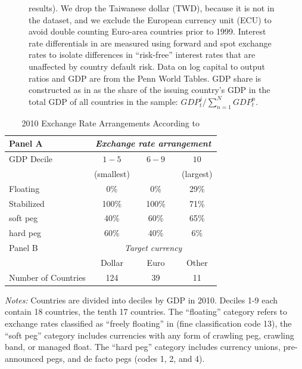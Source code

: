 \documentclass[12pt,letter]{article}
\theoremstyle{break} \theorembodyfont{\normalfont\itshape}
\theoremstyle{break}
\theoremstyle{break} \theorembodyfont{\normalfont\itshape}
\theoremstyle{break} \theorembodyfont{\normalfont\itshape}
\begin{document}
\begin{figure}
\begin{minipage}{\linewidth}
    results). We drop the Taiwanese dollar (TWD), because it is not in
    the \citet{ilzetzki2018exchange} dataset, and we exclude the
    European currency unit (ECU) to avoid double counting Euro-area
    countries prior to 1999. Interest rate differentials in
    \citet{HassanMano2015} are measured using forward and spot
    exchange rates to isolate differences in ``risk-free'' interest
    rates that are unaffected by country default risk. Data on log
    capital to output ratios and GDP are from the Penn World Tables.
    GDP share is constructed as in \cite{Hassan2013} as the share of
    the issuing country's GDP in the total GDP of all countries in the
    sample: $GDP^j_t / \sum^N_{n = 1} GDP^n_t$.
  \end{minipage}
\end{figure}

\clearpage

\begin{table}[]
  \caption{2010 Exchange Rate Arrangements According to
    \citet*{ilzetzki2018exchange}\label{ta:RR}}
  \begin{center}
    \begin{tabular}{lccc}
      \hline \hline
      Panel A & \multicolumn{3}{c}{\textit{Exchange rate arrangement}} \\
      \midrule
      GDP Decile & $\quad 1 - 5 \quad$  & $\quad 6 - 9 \quad$ & $10$ \\
              &(smallest)&&(largest)\\
      \midrule
      Floating & 0\% & 0\% & 29\%\\
      Stabilized & 100\% & 100\% & 71\% \\
      \phantom{of which }soft peg & 40\% & 60\% & 65\%\\
      \phantom{of which }hard peg & 60\% & 40\% & 6\%\\
      \midrule
      Panel B & \multicolumn{3}{c}{\textit{Target currency}} \\
      \midrule
              & Dollar & Euro & Other \\
      Number of Countries          & 124   & 39 & 11 \\
      \hline \hline
    \end{tabular}
  \end{center}
  \small\textit{Notes: }Countries are divided into deciles by GDP in
  2010. Deciles 1-9 each contain 18 countries, the tenth 17 countries.
  The ``floating'' category refers to exchange rates classified as
  ``freely floating'' in \citet*{ilzetzki2018exchange} (fine
  classification code 13), the ``soft peg'' category includes
  currencies with any form of crawling peg, crawling band, or managed
  float. The ``hard peg'' category includes currency unions,
  pre-announced pegs, and de facto pegs (codes 1, 2, and 4).
\end{table}
\end{document}
